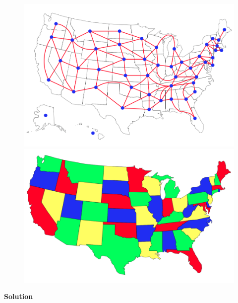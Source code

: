 \documentclass{article}
\begin{document}
\begin{figure}[!h]
\centering
\begin{minipage}{.5\textwidth}
  \centering
  \includegraphics[width=.4\linewidth]{usa0.png}
\end{minipage}%
\begin{minipage}{.5\textwidth}
  \centering
  \includegraphics[width=.4\linewidth]{usa1.png}
\end{minipage}
\end{figure}

\begin{mdframed}
\textbf{Solution}

\end{mdframed}
\clearpage
\end{document}
